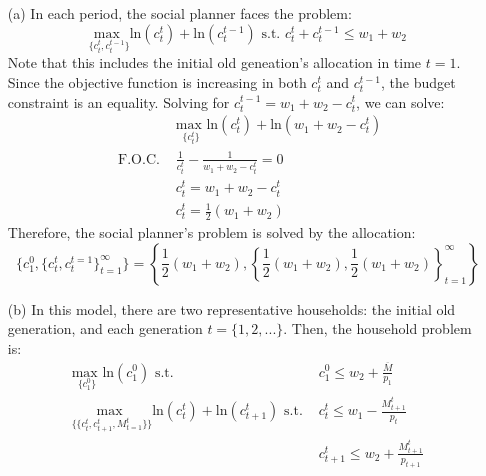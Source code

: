 \documentclass{article}
\newcommand{\loge}[1]{\text{ln}\left(#1\right)}
\newcommand{\usmax}[1]{\underset{\{#1\}}{\text{max }}}
\begin{document}
\begin{itemize}
	\item[(a)] In each period, the social planner faces the problem:
		\[
			\usmax{c_t^t,c_t^{t-1}}\loge{c_t^t} + \loge{c_t^{t-1}} \text{ s.t. } c_t^t + c_t^{t-1} \leq w_1 + w_2
		\]
		Note that this includes the initial old geneation's allocation in time $t=1$. Since the objective function is increasing in both $c_t^t$ and $c_t^{t-1}$, the budget constraint is an equality. Solving for $c_t^{t-1} = w_1 + w_2-c_t^t$, we can solve:
		\begin{align*}
			&\usmax{c_t^t}\loge{c_t^t} + \loge{w_1 + w_2-c_t^t} \\
			\text{ F.O.C. } &\frac{1}{c_t^t} - \frac{1}{w_1+w_2-c_t^t} = 0	\\
							&c_t^t = w_1 + w_2 -c_t^t 						\\
							&c_t^t = \frac{1}{2}(w_1 + w_2)
		\end{align*}
		Therefore, the social planner's problem is solved by the allocation:
		\[
			\{c_1^0,\{c_t^t,c_t^{t=1}\}_{t=1}^\infty\}=\left\{\frac{1}{2}(w_1 + w_2),\left\{\frac{1}{2}(w_1 + w_2),\frac{1}{2}(w_1 + w_2)\right\}_{t=1}^\infty\right\}
		\]
		
	\item[(b)] In this model, there are two representative households: the initial old generation, and each generation $t=\{1,2,...\}$. Then, the household problem is:
		\begin{align*}
			\usmax{c_1^0}\loge{c_1^0}												\text{ s.t. } 	&c_1^0		\leq w_2 + \frac{\overline{M}}{p_1}	\\
			\usmax{\{c_t^t,c_{t+1}^t,M^t_{t=1}\}}\loge{c_t^t} + \loge{c_{t+1}^t}	\text{ s.t. } 	&c_t^t 		\leq w_1 - \frac{M_{t+1}^t}{p_t}	\\
																									&c_{t+1}^t 	\leq w_2 + \frac{M_{t+1}^t}{p_{t+1}}
		\end{align*}
		

\end{itemize}
\end{document}
